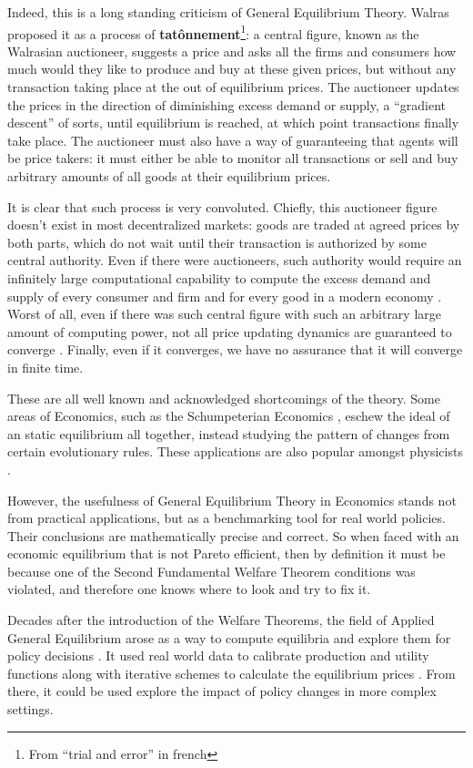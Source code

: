 Indeed, this is a long standing criticism of General Equilibrium Theory. Walras proposed it as a process of \textbf{tatônnement}\footnote{From ``trial and error'' in french}: a central figure, known as the Walrasian auctioneer, suggests a price and asks all the firms and consumers how much would they like to produce and buy at these given prices, but without any transaction taking place at the out of equilibrium prices. The auctioneer updates the prices in the direction of diminishing excess demand or supply, a ``gradient descent'' of sorts, until equilibrium is reached, at which point transactions finally take place. The auctioneer must also have a way of guaranteeing that agents will be price takers: it must either be able to monitor all transactions or sell and buy arbitrary amounts of all goods at their equilibrium prices.

It is clear that such process is very convoluted. Chiefly, this auctioneer figure doesn't exist in most decentralized markets: goods are traded at agreed prices by both parts, which do not wait until their transaction is authorized by some central authority. Even if there were auctioneers, such authority would require an infinitely large computational capability to compute the excess demand and supply of every consumer and firm and for every good in a modern economy \cite{axtell05, Roughgarden10}. Worst of all, even if there was such central figure with such an arbitrary large amount of computing power, not all price updating dynamics are guaranteed to converge \cite{Gintis07}. Finally, even if it converges, we have no assurance that it will converge in finite time.

These are all well known and acknowledged shortcomings of the theory. Some areas of Economics, such as the Schumpeterian Economics \cite{Schumpeter39}, eschew the ideal of an static equilibrium all together, instead studying the pattern of changes from certain evolutionary rules. These applications are also popular amongst physicists \cite{thurner}.

However, the usefulness of General Equilibrium Theory in Economics stands not from practical applications, but as a benchmarking tool for real world policies. Their conclusions are mathematically precise and correct. So when faced with an economic equilibrium that is not Pareto efficient, then by definition it must be because one of the Second Fundamental Welfare Theorem conditions was violated, and therefore one knows where to look and try to fix it.

Decades after the introduction of the Welfare Theorems, the field of Applied General Equilibrium arose as a way to compute equilibria and explore them for policy decisions \cite{shoven1984, shoven1992}. It used real world data to calibrate production and utility functions along with iterative schemes to calculate the equilibrium prices \cite{scarf1967}. From there, it could be used explore the impact of policy changes in more complex settings.


